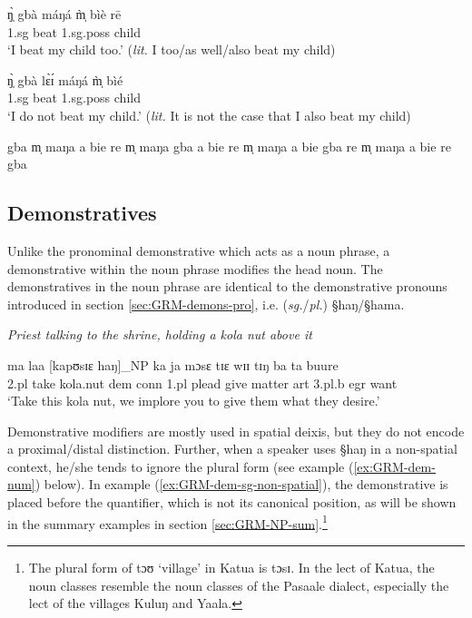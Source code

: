\begin{exe}
 \ex\label{ex:GRM-too}
\begin{xlist}
 \ex\label{ex:GRM-too-pos}
\gll ŋ̩̀ gbà máŋá m̩̀ bìè rē \\
{\sc 1.sg} {\quant} beat {\sc 1.sg.poss}  child {\foc}\\
\glt  `I beat my child too.' ({\it lit.} I too/as well/also beat my
child)

 \ex\label{ex:GRM-too-neg}
\gll ŋ̩̀ gbà lɛ̀ɪ́ máŋá  m̩̀ bìé  \\
{\sc 1.sg} {\quant}  {\neg} beat {\sc 1.sg.poss}  child \\
\glt  `I do not beat my child.' ({\it lit.} It is not the case that I also
beat my child)


 \ex\label{ex:GRM-too-out-1}   \textasteriskcentered  gba m̩  maŋa a bie re
\ex \textasteriskcentered  m̩ maŋa gba a bie re
 \ex \textasteriskcentered  m̩ maŋa  a bie gba re
 \ex\label{ex:GRM-too-out-4} \textasteriskcentered  m̩ maŋa  a bie  re gba
\end{xlist}
\end{exe}

\subsection{Demonstratives}
\label{sec:GRM-demons}


Unlike the pronominal demonstrative which acts as a noun phrase, 
a demonstrative
within the noun phrase modifies the head noun. The demonstratives in the noun
phrase are identical to the demonstrative pronouns introduced in section
\ref{sec:GRM-demons-pro}, i.e. ({\it sg.}/{\it pl.}) {\S haŋ}/{\S hama}.  



\begin{exe}
   \ex\label{ex:GRM-dem-sg}{\it Priest talking to the shrine, holding a kola
nut above it}

\gll  ma laa [kapʊsɪɛ haŋ]_{NP} ka ja mɔsɛ tɪɛ wɪɪ tɪŋ ba ta buure\\
{\sc 2.pl} take kola.nut {\sc dem} {\sc conn} {\sc 1.pl} plead give matter {\sc
art} {\sc 3.pl.b} {\sc  egr} want\\
\glt   `Take this kola nut, we implore  you to give them what they desire.'

\end{exe}

Demonstrative  modifiers are mostly used in spatial deixis, but they do not
encode a proximal/distal distinction. Further, when a speaker uses {\S haŋ}  in
a non-spatial context, he/she tends to ignore the plural form (see example
(\ref{ex:GRM-dem-num}) below). In example (\ref{ex:GRM-dem-sg-non-spatial}), the
 demonstrative is placed before the quantifier,  which is not its canonical
position, as will be  shown in the summary examples in section
\ref{sec:GRM-NP-sum}.\footnote{The plural form of {\F tɔʊ} `village' in Katua is
{\F tɔsɪ}. In the lect of Katua, the noun classes resemble the noun classes of
the Pasaale dialect, especially the lect of the villages  Kuluŋ and Yaala.} 



